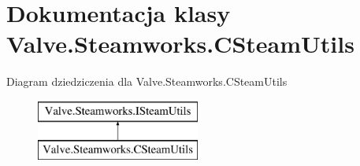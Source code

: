 \hypertarget{class_valve_1_1_steamworks_1_1_c_steam_utils}{}\section{Dokumentacja klasy Valve.\+Steamworks.\+C\+Steam\+Utils}
\label{class_valve_1_1_steamworks_1_1_c_steam_utils}
Diagram dziedziczenia dla Valve.\+Steamworks.\+C\+Steam\+Utils\begin{figure}[H]
\begin{center}
\leavevmode
\includegraphics[height=2.000000cm]{class_valve_1_1_steamworks_1_1_c_steam_utils}
\end{center}
\end{figure}
